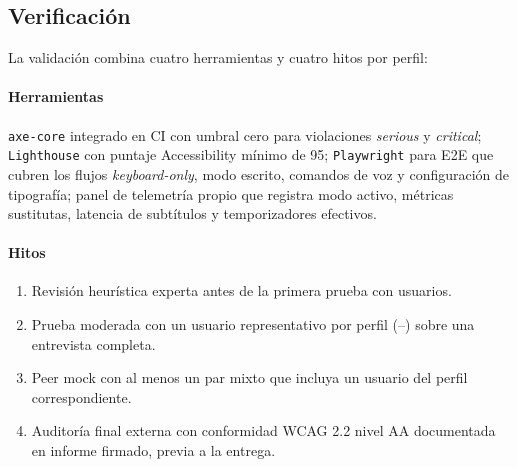 \subsection{Verificación}

La validación combina cuatro herramientas y cuatro hitos por perfil:

\paragraph{Herramientas} \texttt{axe-core} integrado en CI con umbral
cero para violaciones \textit{serious} y \textit{critical};
\texttt{Lighthouse} con puntaje Accessibility mínimo de 95;
\texttt{Playwright} para E2E que cubren los flujos
\textit{keyboard-only}, modo escrito, comandos de voz y configuración
de tipografía; panel de telemetría propio que registra modo activo,
métricas sustitutas, latencia de subtítulos y temporizadores efectivos.

\paragraph{Hitos}
\begin{enumerate}
  \item Revisión heurística experta antes de la primera prueba con
        usuarios.
  \item Prueba moderada con un usuario representativo por perfil
        (--) sobre una entrevista completa.
  \item Peer mock con al menos un par mixto que incluya un usuario
        del perfil correspondiente.
  \item Auditoría final externa con conformidad WCAG 2.2 nivel AA
        documentada en informe firmado, previa a la entrega.
\end{enumerate}
